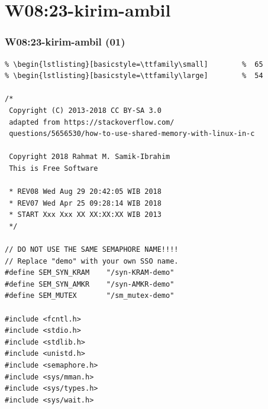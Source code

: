 \documentclass[aspectratio=169, xcolor=table, notheorems, hyperref={pdfpagelabels=false}]{beamer}
\begin{document}
\section{W08:23-kirim-ambil}
\begin{frame}[fragile]
\frametitle{W08:23-kirim-ambil (01)}
\begin{lstlisting}[basicstyle=\ttfamily\tiny]         % 108
% \begin{lstlisting}[basicstyle=\ttfamily\footnotesize] %  72
% \begin{lstlisting}[basicstyle=\ttfamily\small]        %  65
% \begin{lstlisting}[basicstyle=\ttfamily\large]        %  54

/*
 Copyright (C) 2013-2018 CC BY-SA 3.0
 adapted from https://stackoverflow.com/
 questions/5656530/how-to-use-shared-memory-with-linux-in-c

 Copyright 2018 Rahmat M. Samik-Ibrahim
 This is Free Software

 * REV08 Wed Aug 29 20:42:05 WIB 2018
 * REV07 Wed Apr 25 09:28:14 WIB 2018
 * START Xxx Xxx XX XX:XX:XX WIB 2013
 */

// DO NOT USE THE SAME SEMAPHORE NAME!!!!
// Replace "demo" with your own SSO name.
#define SEM_SYN_KRAM    "/syn-KRAM-demo"
#define SEM_SYN_AMKR    "/syn-AMKR-demo"
#define SEM_MUTEX       "/sm_mutex-demo"

#include <fcntl.h>
#include <stdio.h>
#include <stdlib.h>
#include <unistd.h>
#include <semaphore.h>
#include <sys/mman.h>
#include <sys/types.h>
#include <sys/wait.h>

\end{lstlisting}
\end{frame}
\end{document}
